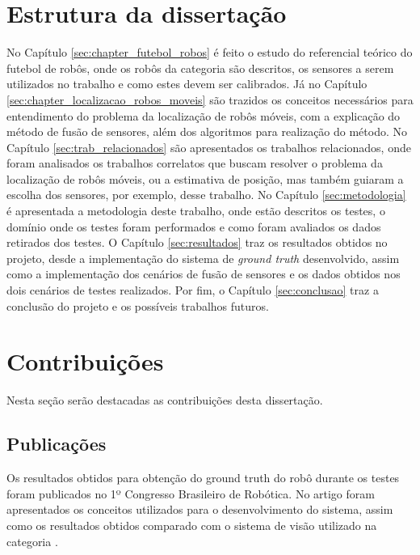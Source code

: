 \documentclass[acronym, symbols, table, deposito]{fei}
\begin{document}
	\section{Estrutura da dissertação}
	
		No Capítulo \ref{sec:chapter_futebol_robos} é feito o estudo do referencial teórico do futebol de robôs, onde os robôs da categoria  são descritos, os sensores a serem utilizados no trabalho e como estes devem ser calibrados. Já no Capítulo \ref{sec:chapter_localizacao_robos_moveis} são trazidos os conceitos necessários para entendimento do problema da localização de robôs móveis, com a explicação do método de fusão de sensores, além dos algoritmos para realização do método. No Capítulo \ref{sec:trab_relacionados} são apresentados os trabalhos relacionados, onde foram analisados os trabalhos correlatos que buscam resolver o problema da localização de robôs móveis, ou a estimativa de posição, mas também guiaram a escolha dos sensores, por exemplo, desse trabalho. No Capítulo \ref{sec:metodologia} é apresentada a metodologia deste trabalho, onde estão descritos os testes, o domínio onde os testes foram performados e como foram avaliados os dados retirados dos testes. O Capítulo \ref{sec:resultados} traz os resultados obtidos no projeto, desde a implementação do sistema de \textit{ground truth} desenvolvido, assim como a implementação dos cenários de fusão de sensores e os dados obtidos nos dois cenários de testes realizados. Por fim, o Capítulo \ref{sec:conclusao} traz a conclusão do projeto e os possíveis trabalhos futuros. %
		
	\section{Contribuições}
	
		Nesta seção serão destacadas as contribuições desta dissertação.
		
		\subsection{Publicações}
		
			Os resultados obtidos para obtenção do ground truth do robô durante os testes foram publicados no 1º Congresso Brasileiro de Robótica. No artigo foram apresentados os conceitos utilizados para o desenvolvimento do sistema, assim como os resultados obtidos comparado com o sistema de visão utilizado na categoria .
			
\end{document}
